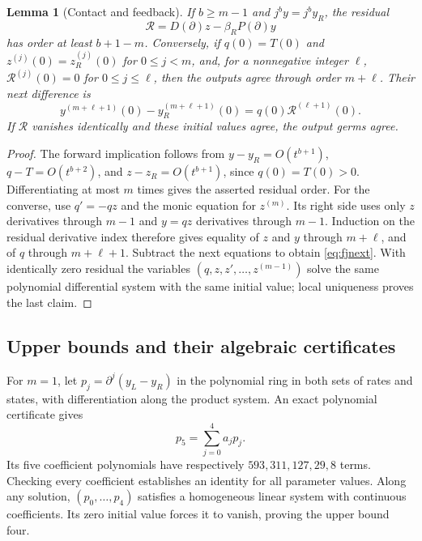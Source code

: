 \documentclass[11pt]{article}
\newtheorem{lemma}[theorem]{Lemma}
\theoremstyle{remark}\newtheorem{remark}[theorem]{Remark}
\begin{document}
\begin{lemma}[Contact and feedback]\label{lem:fjcontact}
If $b\geq m-1$ and $j^by=j^by_R$, the residual
\[
 \mathcal R=D(\partial)z-\beta_R P(\partial)y
\]
has order at least $b+1-m$. Conversely, if $q(0)=T(0)$ and
$z^{(j)}(0)=z_R^{(j)}(0)$ for $0\leq j<m$, and, for a nonnegative integer $\ell$,
$\mathcal R^{(j)}(0)=0$ for $0\leq j\leq\ell$, then the outputs agree
through order $m+\ell$. Their next difference is
\begin{equation}\label{eq:fjnext}
 y^{(m+\ell+1)}(0)-y_R^{(m+\ell+1)}(0)
   =q(0)\mathcal R^{(\ell+1)}(0).
\end{equation}
If $\mathcal R$ vanishes identically and these initial values agree, the
output germs agree.
\end{lemma}
\begin{proof}
The forward implication follows from $y-y_R=O(t^{b+1})$,
$q-T=O(t^{b+2})$, and $z-z_R=O(t^{b+1})$, since $q(0)=T(0)>0$.
Differentiating at most $m$ times gives the asserted residual order.
For the converse, use $q'=-qz$ and the monic equation for $z^{(m)}$.
Its right side uses only $z$ derivatives through $m-1$ and $y=qz$
derivatives through $m-1$. Induction on the residual derivative index
therefore gives equality of $z$ and $y$ through $m+\ell$, and of $q$
through $m+\ell+1$. Subtract the next equations to obtain
\eqref{eq:fjnext}. With identically zero residual the variables
$(q,z,z',\ldots,z^{(m-1)})$ solve the same polynomial differential
system with the same initial value; local uniqueness proves the last claim.
\end{proof}

\subsection{Upper bounds and their algebraic certificates}
For $m=1$, let $p_j=\partial^j(y_L-y_R)$ in the polynomial ring in both
sets of rates and states, with differentiation along the product system.
An exact polynomial certificate gives
\begin{equation}\label{eq:fjideal}
 p_5=\sum_{j=0}^4 a_jp_j.
\end{equation}
Its five coefficient polynomials have respectively $593,311,127,29,8$
terms. Checking every coefficient establishes an identity for all parameter
values. Along any solution, $(p_0,\ldots,p_4)$ satisfies a homogeneous
linear system with continuous coefficients. Its zero initial value forces
it to vanish, proving the upper bound four.
\end{document}
